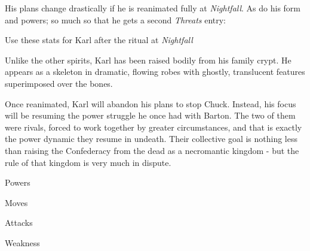 \documentclass{motw}
\begin{document}
His plans change drastically if he is reanimated fully at \emph{Nightfall}.  As do his form and powers; so much so that he gets a second \emph{Threats} entry:


Use these stats for Karl after the ritual at \emph{Nightfall}

Unlike the other spirits, Karl has been raised bodily from his family crypt.  He appears as a skeleton in dramatic, flowing robes with ghostly, translucent features superimposed over the bones.

Once reanimated, Karl will abandon his plans to stop Chuck.  Instead, his focus will be resuming the power struggle he once had with Barton.  The two of them were rivals, forced to work together by greater circumstances, and that is exactly the power dynamic they resume in undeath.  Their collective goal is nothing less than raising the Confederacy from the dead as a necromantic kingdom - but the rule of that kingdom is very much in dispute.


\begin{mStatList}{Powers}
\end{mStatList}

\begin{mStatList}{Moves}
\end{mStatList}

\begin{mStatBlock}{Attacks}
\end{mStatBlock}

\begin{mStatBlock}{Weakness}
\end{mStatBlock}


\end{document}
